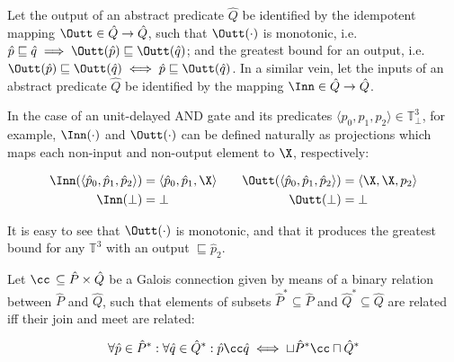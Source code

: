 Let the output of an abstract predicate $\hat Q$ be identified by the idempotent mapping $\Outt \in \hat Q \rightarrow \hat Q$, such that $\Outt(\cdot)$ is monotonic, i.e. $\hat p \sqsubseteq \hat q \implies \Outt(\hat p) \sqsubseteq \Outt(\hat q)$; and the greatest bound for an output, i.e. $\Outt(\hat p) \sqsubseteq \Outt(\hat q) \iff \hat p \sqsubseteq \Outt(\hat q)$. In a similar vein, let the inputs of an abstract predicate $\hat Q$ be identified by the mapping $\Inn \in \hat Q \rightarrow \hat Q$.



In the case of an unit-delayed AND gate and its predicates $\langle p_{0}, p_{1}, p_{2} \rangle \in \mathbb{T}_{\bot}^{3}$, for example, $\Inn(\cdot)$ and $\Outt(\cdot)$ can be defined naturally as projections which maps each non-input and non-output element to $\X$, respectively:

\begin{equation*}
\begin{aligned}[t]
\Inn(\langle \hat p_{0}, \hat p_{1}, \hat p_{2} \rangle) &= \langle \hat p_{0}, \hat p_{1}, \X \rangle \\
\Inn(\bot) &= \bot
\end{aligned}
\qquad
\begin{aligned}[t]
\Outt(\langle \hat p_{0}, \hat p_{1}, \hat p_{2} \rangle) &= \langle \X, \X, p_{2} \rangle \\
\Outt(\bot) &= \bot
\end{aligned}
\end{equation*}

\noindent It is easy to see that $\Outt(\cdot)$ is monotonic, and that it produces the greatest bound for any $\mathbb{T}^{3}$ with an output $\sqsubseteq \hat p_{2}$.

Let $\cc \, \subseteq \hat P \times \hat Q$ be a Galois connection given by means of a binary relation between $\hat P$ and $\hat Q$, such that elements of subsets $\hat P^{*} \subseteq \hat P$ and $\hat Q^{*} \subseteq \hat Q$ are related iff their join and meet are related:

\begin{equation*}
\forall \hat p \in \hat P^{*} : \forall \hat q \in \hat Q^{*} : \hat p \cc \hat q \iff \sqcup \hat P^{*} \cc \sqcap \hat Q^{*}
\end{equation*}

